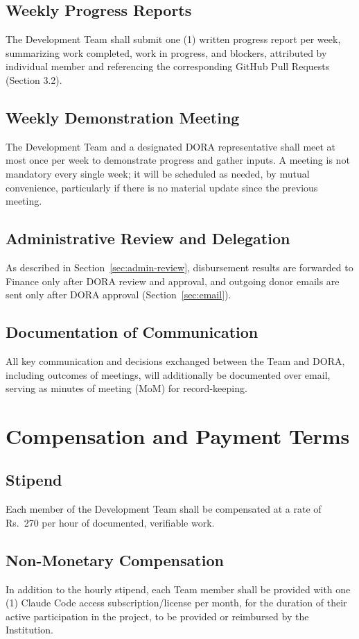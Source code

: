 \documentclass[11pt]{article}
\begin{document}
\subsection{Weekly Progress Reports}
The Development Team shall submit one (1) written progress report per week, summarizing work completed, work in progress, and blockers, attributed by individual member and referencing the corresponding GitHub Pull Requests (Section 3.2).

\subsection{Weekly Demonstration Meeting}
The Development Team and a designated DORA representative shall meet at most once per week to demonstrate progress and gather inputs. A meeting is not mandatory every single week; it will be scheduled as needed, by mutual convenience, particularly if there is no material update since the previous meeting.

\subsection{Administrative Review and Delegation}
As described in Section~\ref{sec:admin-review}, disbursement results are forwarded to Finance only after DORA review and approval, and outgoing donor emails are sent only after DORA approval (Section~\ref{sec:email}).

\subsection{Documentation of Communication}
All key communication and decisions exchanged between the Team and DORA, including outcomes of meetings, will additionally be documented over email, serving as minutes of meeting (MoM) for record-keeping.

\section{Compensation and Payment Terms}
\label{sec:compensation}

\subsection{Stipend}
Each member of the Development Team shall be compensated at a rate of Rs.~270 per hour of documented, verifiable work.

\subsection{Non-Monetary Compensation}
In addition to the hourly stipend, each Team member shall be provided with one (1) Claude Code access subscription/license per month, for the duration of their active participation in the project, to be provided or reimbursed by the Institution.
\end{document}
